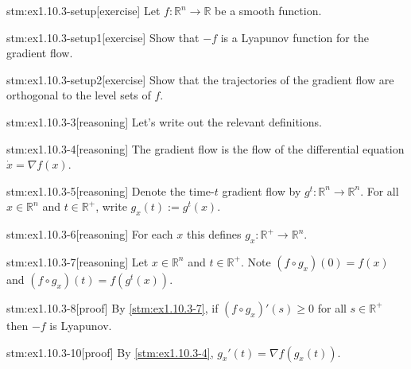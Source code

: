 
\begin{stm}{stm:ex1.10.3-setup}[exercise]
Let $f : \mathbb{R}^n \to \mathbb{R}$ be a smooth function. 
\end{stm}

\begin{stm}{stm:ex1.10.3-setup1}[exercise]
Show that $-f$ is a Lyapunov function for the gradient flow.
\end{stm}
    
\begin{stm}{stm:ex1.10.3-setup2}[exercise]
Show that the trajectories of the gradient flow are orthogonal to the level sets of $f$.
\end{stm}


\begin{stm}{stm:ex1.10.3-3}[reasoning]
Let's write out the relevant definitions.
\end{stm}

\begin{stm}{stm:ex1.10.3-4}[reasoning]
The gradient flow is the flow of the differential equation $\dot{x} = \nabla f(x)$.
\end{stm}

\begin{stm}{stm:ex1.10.3-5}[reasoning]
Denote the time-$t$ gradient flow by $g^t : \mathbb{R}^n \to \mathbb{R}^n$. For all $x \in \mathbb{R}^n$ and $t \in \mathbb{R}^+$, write $g_x(t) := g^t(x)$.
\end{stm}

\begin{stm}{stm:ex1.10.3-6}[reasoning]
For each $x$ this defines $g_x : \mathbb{R}^+ \to \mathbb{R}^n$.
\end{stm}

\begin{stm}{stm:ex1.10.3-7}[reasoning]
Let $x \in \mathbb{R}^n$ and $t \in \mathbb{R}^+$. Note $(f \circ g_x)(0) = f(x)$ and $(f \circ g_x)(t) = f(g^t(x))$.
\end{stm}

\begin{stm}{stm:ex1.10.3-8}[proof]
By \ref{stm:ex1.10.3-7}, if $(f \circ g_x)'(s) \ge 0$ for all $s \in \mathbb{R}^+$ then $-f$ is Lyapunov.
\end{stm}

\begin{stm}{stm:ex1.10.3-10}[proof]
By \ref{stm:ex1.10.3-4}, $g_x'(t) = \nabla f(g_x(t))$. 
\end{stm}

